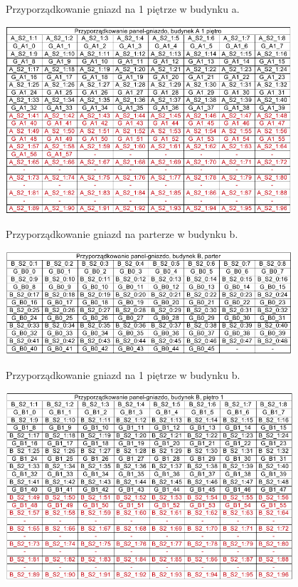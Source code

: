 \documentclass{report}
\begin{document}
\begin{table}[H]
\caption{Przyporządkowanie gniazd na 1 piętrze w budynku a.}
 \centering
      \includegraphics[width=0.8\textwidth]{./obrazki/tab_kros/a1.png}
\end{table}

\begin{table}[H]
\caption{Przyporządkowanie gniazd na parterze w budynku b.}
 \centering
      \includegraphics[width=0.8\textwidth]{./obrazki/tab_kros/b0.png}
\end{table}

\begin{table}[H]
\caption{Przyporządkowanie gniazd na 1 piętrze w budynku b.}
 \centering
      \includegraphics[width=0.8\textwidth]{./obrazki/tab_kros/b1.png}
\end{table}
\end{document}
